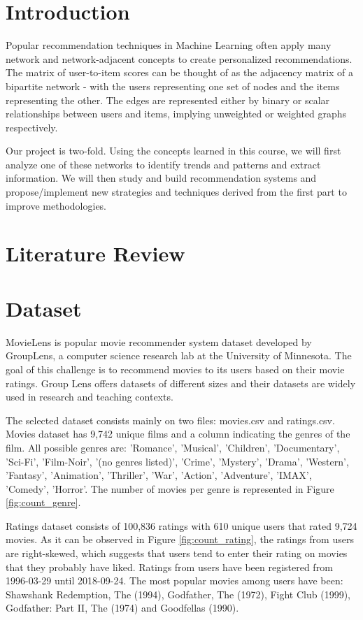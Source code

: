 \documentclass[12pt]{article}
\numberwithin{equation}{section}
\begin{document}
\newpage

\section{Introduction}

Popular recommendation techniques in Machine Learning often apply many network and network-adjacent concepts to create personalized recommendations. The matrix of user-to-item scores can be thought of as the adjacency matrix of a bipartite network - with the users representing one set of nodes and the items representing the other. The edges are represented either by binary or scalar relationships between users and items, implying unweighted or weighted graphs respectively.

Our project is two-fold. Using the concepts learned in this course, we will first analyze one of these networks to identify trends and patterns and extract information. We will then study and build recommendation systems and propose/implement new strategies and techniques derived from the first part to improve methodologies.

\section{Literature Review}

\section{Dataset}

MovieLens is popular movie recommender system dataset developed by GroupLens, a computer science research lab at the University of Minnesota. The goal of this challenge is to recommend movies to its users based on their movie ratings. Group Lens offers datasets of different sizes and their datasets are widely used in research and teaching contexts.

The selected dataset consists mainly on two files: movies.csv and ratings.csv. Movies dataset has 9,742 unique films and a column indicating the genres of the film. All possible genres are: 'Romance', 'Musical', 'Children', 'Documentary', 'Sci-Fi', 'Film-Noir', '(no genres listed)', 'Crime', 'Mystery', 'Drama', 'Western', 'Fantasy', 'Animation', 'Thriller', 'War', 'Action', 'Adventure', 'IMAX', 'Comedy', 'Horror'. The number of movies per genre is represented in Figure \ref{fig:count_genre}.

Ratings dataset consists of 100,836 ratings with 610 unique users that rated 9,724 movies. As it can be observed in Figure \ref{fig:count_rating}, the ratings from users are right-skewed, which suggests that users tend to enter their rating on movies that they probably have liked. Ratings from users have been registered from 1996-03-29 until 2018-09-24. The most popular movies among users have been: Shawshank Redemption, The (1994), Godfather, The (1972), Fight Club (1999), Godfather: Part II, The (1974) and Goodfellas (1990).
\end{document}
